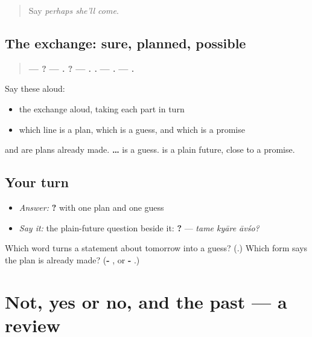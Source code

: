 \begin{quote}
Say \emph{perhaps she'll come}.
\end{quote}

\subsection*{The exchange: sure, planned, possible}
\begin{quote}
\textbf{—     ?} \textbf{—    . ?} \textbf{—    .    .} \textbf{—    .} \textbf{—     .}
\end{quote}

Say these aloud:

\begin{itemize}
\raggedright
  \item the exchange aloud, taking each part in turn
  \item which line is a plan, which is a guess, and which is a promise
\end{itemize}

\textbf{ } and \textbf{ } are plans already made. \textbf{ … } is a guess. \textbf{} is a plain future, close to a promise.

\subsection*{Your turn}
\begin{itemize}
\raggedright
  \item \emph{Answer:} \textbf{    ?} with one plan and one guess
  \item \emph{Say it:} the plain-future question beside it: \textbf{  ?} — \emph{tame kyāre āvśo?}
\end{itemize}

\begin{tcolorbox}[breakable,colback=teal!4,colframe=teal!35!black,title={Before you move on}]
Which word turns a statement about tomorrow into a guess? (\textbf{}.) Which form says the plan is already made? (\textbf{- }, or \textbf{- }.)
\end{tcolorbox}
\section[(dialogue)]{Not, yes or no, and the past — a review}


